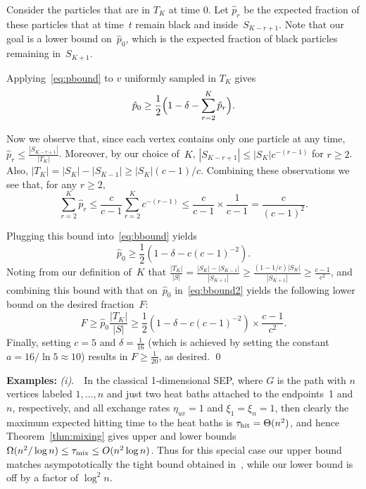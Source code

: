 \documentclass[11pt]{article}
\theoremstyle{plain}
\theoremstyle{definition}
\theoremstyle{remark}
\numberwithin{equation}{section}
\newcommand{\tmix}{\tau_{\rm mix}}
\newcommand{\hit}{\tau_{\rm hit}}
\newenvironment{proofof}[1]{{\par\bigskip\noindent \em Proof of #1.}\/}{\hfill\qed\bigskip}
\begin{document}
\begin{proofof}{Lemma~\ref{lem:lowerbd}}
Consider the particles that are in $T_K$ at time $0$. Let $\hat p_r$ be the expected fraction of these particles
that at time~$t$ remain black and inside~$S_{K-r+1}$.  Note that our goal is a lower bound on~$\hat p_0$, which 
is the expected fraction of black particles remaining in~$S_{K+1}$.

Applying~\eqref{eq:pbound} to $v$ uniformly sampled in $T_K$ gives
\begin{equation}\label{eq:bbound}
    \hat p_0 \ge \frac{1}{2}\Bigl(1-\delta - \sum_{r=2}^K \hat p_r\Bigr).
\end{equation}    

Now we observe that, since each vertex contains only one particle at any time,
$\hat p_r \le \frac{|S_{K-r+1}|}{|T_K|}$.  Moreover, by our choice of~$K$,
$|S_{K-r+1}|\leq |S_K|c^{-(r-1)}$ for $r\ge 2$.  Also, $|T_K| = |S_K|-|S_{K-1}|\geq |S_K|(c-1)/c$.
Combining these observations we see that, for any $r\ge 2$,
$$
   \sum_{r=2}^K \hat p_r  \leq \frac{c}{c-1}\sum_{r=2}^K  c^{-(r-1)} 
           \leq \frac{c}{c-1} \times \frac{1}{c-1} = \frac{c}{(c-1)^2}.  $$

Plugging this bound into~\eqref{eq:bbound} yields
\begin{equation}\label{eq:bbound2}
   \hat p_0 \ge \frac{1}{2}(1-\delta -c(c-1)^{-2}).
\end{equation}   
Noting from our definition of~$K$ that 
$\frac{|T_K|}{|S|} = \frac{|S_K|-|S_{K-1}|}{|S_{K+1}|} \ge \frac{(1-1/c)|S_K|}{|S_{K+1}|} \ge \frac{c-1}{c^2}$,
and combining this bound with that on~$\hat p_0$ in~\eqref{eq:bbound2} yields the following lower bound on the desired
fraction~$F$: $$
    F\ge \hat p_0\frac{|T_K|}{|S|} \ge \frac{1}{2}(1-\delta -c(c-1)^{-2})\times \frac{c-1}{c^2}.  $$
Finally, setting $c=5$ and $\delta=\frac{1}{16}$ (which is achieved by setting the constant $a=16/\ln 5\approx 10$) 
results in $F\ge\frac{1}{20}$, as desired.
\end{proofof}

{\bf Examples:} {\it (i)}.\ \
In the classical 1-dimensional SEP, where
$G$ is the path with $n$ vertices labeled $1,\ldots,n$ and just two
heat baths attached to the endpoints~1 and~$n$, respectively, and all exchange rates
$\eta_{uv}=1$ and $\xi_1=\xi_n=1$, then clearly the maximum expected hitting time to
the heat baths is $\hit=\Theta(n^2)$, and hence Theorem~\ref{thm:mixing} gives upper
and lower bounds $\Omega(n^2/\log n)\le \tmix\le O(n^2\log n)$.  Thus for this special case
our upper bound matches asympototically the tight bound obtained in~\cite{Nestoridi}, 
while our lower bound is off by a factor of $\log^2 n$.
\end{document}
